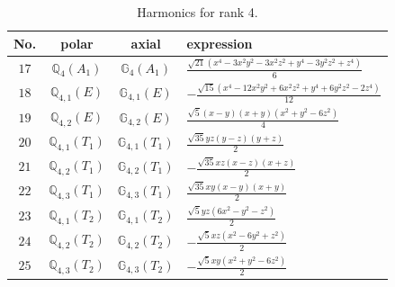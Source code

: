 \documentclass[fleqn,8pt,landscape]{jsarticle}
\begin{document}
\begin{table}[ht!]
\begin{center}
\caption{Harmonics for rank 4.}
\renewcommand{\arraystretch}{1.3}
\begin{tabular}{cccl} \hline \hline
No. & polar & axial & expression \\ \hline
$ 17 $ & $ \mathbb{Q}_{4}(A_{1}) $ & $ \mathbb{G}_{4}(A_{1}) $ & $ \frac{\sqrt{21} \left(x^{4} - 3 x^{2} y^{2} - 3 x^{2} z^{2} + y^{4} - 3 y^{2} z^{2} + z^{4}\right)}{6} $ \\
$ 18 $ & $ \mathbb{Q}_{4,1}(E) $ & $ \mathbb{G}_{4,1}(E) $ & $ - \frac{\sqrt{15} \left(x^{4} - 12 x^{2} y^{2} + 6 x^{2} z^{2} + y^{4} + 6 y^{2} z^{2} - 2 z^{4}\right)}{12} $ \\
$ 19 $ & $ \mathbb{Q}_{4,2}(E) $ & $ \mathbb{G}_{4,2}(E) $ & $ \frac{\sqrt{5} \left(x - y\right) \left(x + y\right) \left(x^{2} + y^{2} - 6 z^{2}\right)}{4} $ \\
$ 20 $ & $ \mathbb{Q}_{4,1}(T_{1}) $ & $ \mathbb{G}_{4,1}(T_{1}) $ & $ \frac{\sqrt{35} y z \left(y - z\right) \left(y + z\right)}{2} $ \\
$ 21 $ & $ \mathbb{Q}_{4,2}(T_{1}) $ & $ \mathbb{G}_{4,2}(T_{1}) $ & $ - \frac{\sqrt{35} x z \left(x - z\right) \left(x + z\right)}{2} $ \\
$ 22 $ & $ \mathbb{Q}_{4,3}(T_{1}) $ & $ \mathbb{G}_{4,3}(T_{1}) $ & $ \frac{\sqrt{35} x y \left(x - y\right) \left(x + y\right)}{2} $ \\
$ 23 $ & $ \mathbb{Q}_{4,1}(T_{2}) $ & $ \mathbb{G}_{4,1}(T_{2}) $ & $ \frac{\sqrt{5} y z \left(6 x^{2} - y^{2} - z^{2}\right)}{2} $ \\
$ 24 $ & $ \mathbb{Q}_{4,2}(T_{2}) $ & $ \mathbb{G}_{4,2}(T_{2}) $ & $ - \frac{\sqrt{5} x z \left(x^{2} - 6 y^{2} + z^{2}\right)}{2} $ \\
$ 25 $ & $ \mathbb{Q}_{4,3}(T_{2}) $ & $ \mathbb{G}_{4,3}(T_{2}) $ & $ - \frac{\sqrt{5} x y \left(x^{2} + y^{2} - 6 z^{2}\right)}{2} $ \\
 \hline \hline
\end{tabular}
\end{center}
\end{table}
\end{document}
